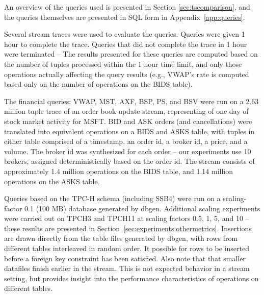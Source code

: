 An overview of the queries used is presented in Section \ref{sec:tscomparison}, and the queries themselves are presented in SQL form in Appendix~\ref{app:queries}.

Several stream traces were used to evaluate the queries.  Queries were given 1 hour to complete the trace.  Queries that did not complete the trace in 1 hour were terminated -- The results presented for these queries are computed based on the number of tuples processed within the 1 hour time limit, and only those operations actually affecting the query results (e.g., VWAP's rate is computed based only on the number of operations on the BIDS table).

The financial queries: VWAP, MST, AXF, BSP, PS, and BSV were run on a 2.63 million tuple trace of an order book update stream, representing of one day of stock market activity for MSFT.  BID and ASK orders (and cancellations) were translated into equivalent operations on a BIDS and ASKS table, with tuples in either table comprised of a timestamp, an order id, a broker id, a price, and a volume.  The broker id was synthesized for each order -- our experiments use 10 brokers, assigned deterministically based on the order id.  The stream consists of approximately 1.4 million operations on the BIDS table, and 1.14 million operations on the ASKS table.  

Queries based on the TPC-H schema (including SSB4) were run on a scaling-factor 0.1 (100 MB) database generated by dbgen\cite{counciltpc}.  Additional scaling experiments were carried out on TPCH3 and TPCH11 at scaling factors 0.5, 1, 5, and 10 -- these results are presented in Section~\ref{sec:experiments:othermetrics}.  Insertions are drawn directly from the table files generated by dbgen, with rows from different tables interleaved in random order.  It possible for rows to be inserted before a foreign key constraint has been satisfied.  Also note that that smaller datafiles finish earlier in the stream.  This is not expected behavior in a stream setting, but provides insight into the performance characteristics of operations on different tables.


